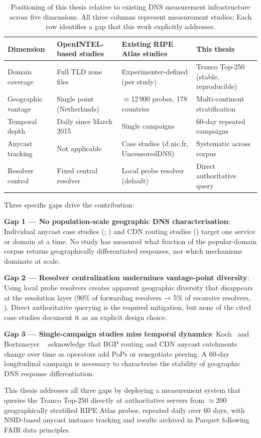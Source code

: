 \begin{table}[tp]
\centering
\small
\begin{tabularx}{\linewidth}{p{2.8cm} p{3.5cm} p{3.8cm} X}
\toprule
\textbf{Dimension} & \textbf{OpenINTEL-based studies}~\cite{vanRijswijk2016} & \textbf{Existing RIPE Atlas studies}~\cite{Bortzmeyer2013,Finnegan2018,Hours2016,Koch2021} & \textbf{This thesis} \\
\midrule
Domain coverage  & Full \ac{TLD} zone files & Experimenter-defined (per study) & Tranco Top-250 (stable, reproducible) \\
Geographic vantage    & Single point (Netherlands) & $\approx$12\,900 probes, 178 countries & Multi-continent stratification \\
Temporal depth & Daily since March 2015 & Single campaigns & 60-day repeated campaigns \\
Anycast tracking       & Not applicable & Case studies (d.nic.fr, UncensoredDNS) & Systematic across corpus \\
Resolver control   & Fixed central resolver & Local probe resolver (default) & Direct authoritative query \\
\bottomrule
\end{tabularx}
\caption{Positioning of this thesis relative to existing \ac{DNS} measurement infrastructure across five dimensions.
All three columns represent measurement studies; Each row identifies a gap that this work explicitly addresses.}
\label{tab:gap_analysis}
\end{table}

Three specific gaps drive the contribution:

\textbf{Gap 1 — No population-scale geographic \ac{DNS} characterisation}: Individual anycast case studies (\cite{Bortzmeyer2013}; \cite{Finnegan2018}) and \ac{CDN} routing studies (\cite{Hours2016,Li2025}) target one service or domain at a time. No study has measured what fraction of the popular-domain corpus returns geographically differentiated responses, nor which mechanisms dominate at scale.

\textbf{Gap 2 — Resolver centralization undermines vantage-point diversity}: Using local probe resolvers creates apparent geographic diversity that disappears at the resolution layer (90\% of forwarding resolvers → 5\% of recursive resolvers, \cite{Xu2023}). Direct authoritative querying is the required mitigation, but none of the cited case studies document it as an explicit design choice.

\textbf{Gap 3 — Single-campaign studies miss temporal dynamics}: Koch~\cite{Koch2021} and Bortzmeyer ~\cite{Bortzmeyer2013} acknowledge that \ac{BGP} routing and \ac{CDN} anycast catchments change over time as operators add \ac{PoPs} or renegotiate peering. A 60-day longitudinal campaign is necessary to characterise the stability of geographic \ac{DNS} response differentiation.

This thesis addresses all three gaps by deploying a measurement system that queries the Tranco Top-250 directly at authoritative servers from $\approx$200 geographically stratified RIPE Atlas probes, repeated daily over 60 days, with \ac{NSID}-based anycast instance tracking and results archived in Parquet following \ac{FAIR} data principles.